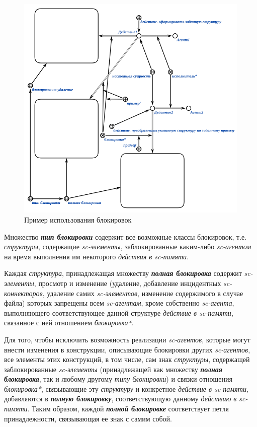 \begin{figure}[h]
	\centering
	\includegraphics[scale=0.8]{images/part3/chapter_situation_management/lock.png}
	\caption{Пример использования блокировок}
	\label{fig:lock}
\end{figure}

Множество \textbf{\textit{тип блокировки}} содержит все возможные классы блокировок, т.е. \textit{структуры}, содержащие \textit{sc-элементы}, заблокированные каким-либо \textit{sc-агентом} на время выполнения им некоторого \textit{действия в sc-памяти}.

Каждая \textit{структура}, принадлежащая множеству \textbf{\textit{полная блокировка}} содержит \textit{sc-элементы}, просмотр и изменение (удаление, добавление инцидентных \textit{sc-коннекторов}, удаление самих \textit{sc-элементов}, изменение содержимого в случае файла) которых запрещены всем \textit{sc-агентам}, кроме собственно \textit{sc-агента}, выполняющего соответствующее данной структуре \textit{действие в sc-памяти}, связанное с ней отношением \textit{блокировка*}.
	
Для того, чтобы исключить возможность реализации \textit{sc-агентов}, которые могут внести изменения в конструкции, описывающие блокировки других \textit{sc-агентов}, все элементы этих конструкций, в том числе, сам знак \textit{структуры}, содержащей заблокированные \textit{sc-элементы} (принадлежащей как множеству \textbf{\textit{полная блокировка}}, так и любому другому \textit{типу блокировки}) и связки отношения \textit{блокировка*}, связывающие эту \textit{структуру} и конкретное \textit{действие в sc-памяти}, добавляются в \textbf{\textit{полную блокировку}}, соответствующую данному \textit{действию в sc-памяти}. Таким образом, каждой \textbf{\textit{полной блокировке}} соответствует петля принадлежности, связывающая ее знак с самим собой.

